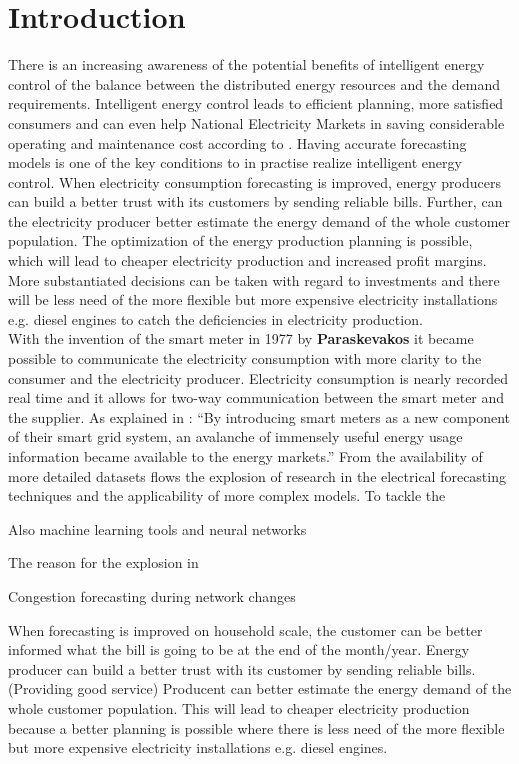 \chapter{Introduction}

There is an increasing awareness of the potential benefits of intelligent energy control of the balance between the distributed energy resources and the demand requirements. Intelligent energy control leads to efficient planning, more satisfied consumers and can even help National Electricity Markets in saving considerable operating and maintenance cost according to \cite{NarjesFallah2018}. Having accurate forecasting models is one of the key conditions to in practise realize intelligent energy control. When electricity consumption forecasting is improved, energy producers can build a better trust with its customers by sending reliable bills. Further, can the electricity producer better estimate the energy demand of the whole customer population. The optimization of the energy production planning is possible, which will lead to cheaper electricity production and increased profit margins. More substantiated decisions can be taken with regard to investments and there will be less need of the more flexible but more expensive electricity installations e.g. diesel engines to catch the deficiencies in electricity production.\\

With the invention of the smart meter in 1977 by \textbf{Paraskevakos} it became possible to communicate the electricity consumption with more clarity to the consumer and the electricity producer. Electricity consumption is nearly recorded real time and it allows for two-way communication between the smart meter and the supplier. As explained in \cite{Depuru2011}: ``By introducing smart meters as a new
component of their smart grid system, an avalanche of immensely useful energy usage information
became available to the energy markets.'' From the availability of more detailed datasets flows the explosion of research in the electrical forecasting techniques and the applicability of more complex models. To tackle the 

Also machine learning tools and neural networks

The reason for the explosion in 


Congestion forecasting during network changes





When forecasting is improved on household scale, the customer can be better informed what the bill is going to be at the end of the month/year.
Energy producer can build a better trust with its customer by sending reliable bills. (Providing good service)
Producent can better estimate the energy demand of the whole customer population. This will lead to cheaper electricity production because a better planning is possible where there is less need of the more 
flexible but more expensive electricity installations e.g. diesel engines.



